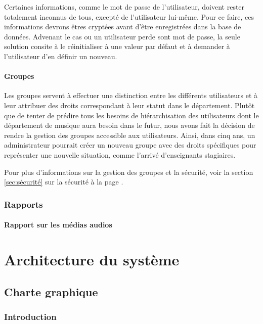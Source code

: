 \documentclass[letter, 11pt]{report}
\begin{document}
Certaines informations, comme le mot de passe de l'utilisateur, doivent rester totalement inconnus de tous, excepté de l'utilisateur lui-même. Pour ce faire, ces informations devrons êtres cryptées avant d'être enregistrées dans la base de données. Advenant le cas ou un utilisateur perde sont mot de passe, la seule solution consite à le réinitialiser à une valeur par défaut et à demander à l'utilisateur d'en définir un nouveau.

\subsubsection{Groupes}

Les groupes servent à effectuer une distinction entre les différents utilisateurs et à leur attribuer des droits correspondant à leur statut dans le département. Plutôt que de tenter de prédire tous les besoins de hiérarchisation des utilisateurs dont le département de musique aura besoin dans le futur, nous avons fait la décision de rendre la gestion des groupes accessible aux utilisateurs. Ainsi, dans cinq ans, un administrateur pourrait créer un nouveau groupe avec des droits spécifiques pour représenter une nouvelle situation, comme l'arrivé d'enseignants stagiaires.

Pour plus d'informations sur la gestion des groupes et la sécurité, voir la section \ref{sec:sécurité} sur la sécurité à la page \pageref{sec:sécurité}.

\subsection{Rapports}

\subsubsection{Rapport sur les médias audios}

\chapter{Architecture du système}

\section{Charte graphique}

\subsection{Introduction}
\end{document}
